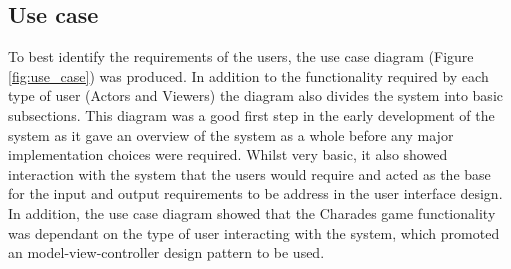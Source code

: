 \subsection{Use case}
\begin{figure}[h!]
\end{figure}
To best identify the requirements of the users, the use case diagram (Figure \ref{fig:use_case}) was produced. In addition to the functionality required by each type of user (Actors and Viewers) the diagram also divides the system into basic subsections. This diagram was a good first step in the early development of the system as it gave an overview of the system as a whole before any major implementation choices were required. Whilst very basic, it also showed interaction with the system that the users would require and acted as the base for the input and output requirements to be address in the user interface design. In addition, the use case diagram showed that the Charades game functionality was dependant on the type of user interacting with the system, which promoted an model-view-controller design pattern to be used.

